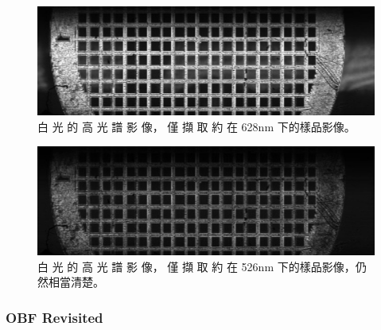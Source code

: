 \documentclass[12pt]{article}
\begin{document}
\begin{figure}
    \centering
    \includegraphics[width = 0.9\linewidth]{1211_10um_10ms-1.jpg}
    \caption{白 光 的 高 光 譜 影 像， 僅 擷 取 約 在
    628nm 下的樣品影像。}
    \label{fig: reflec628}
\end{figure}

\begin{figure}
    \centering
    \includegraphics[width = 0.9\linewidth]{1211_10um_10ms137-1.jpg}
    \caption{白 光 的 高 光 譜 影 像， 僅 擷 取 約 在
    526nm 下的樣品影像，仍然相當清楚。}
    \label{fig: reflec526}
\end{figure}

\subsubsection{OBF Revisited}
\end{document}
